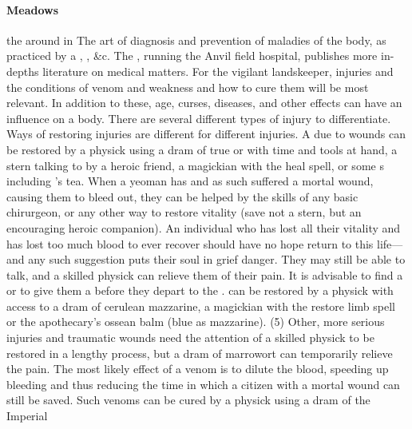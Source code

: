\paragraph{Meadows} the  around  in 
 The art of diagnosis and prevention of maladies of the body, as practiced by a , ,  \&c. The , running the Anvil field hospital, publishes more in-depths literature on medical matters. For the vigilant landskeeper, injuries and the conditions of venom and weakness and how to cure them will be most relevant. In addition to these, age, curses, diseases, and other effects can have an influence on a body. \localpar {} There are several different types of injury to differentiate. Ways of restoring injuries are different for different injuries. \localpar A  due to wounds can be restored by a physick using a dram of true  or with time and tools at hand, a stern talking to by a heroic friend, a magickian with the heal spell, or some s including 's tea. When a yeoman has  and as such suffered a mortal wound, causing them to bleed out, they can be helped by the skills of any basic chirurgeon, or any other way to restore vitality (save not a stern, but an encouraging heroic companion). An individual who has lost all their vitality and has lost too much blood to ever recover should have no hope return to this life—and any such suggestion puts their soul in grief danger. They may still be able to talk, and a skilled physick can relieve them of their pain. It is advisable to find a  or  to give them a  before they depart to the .  can be restored by a physick with access to a dram of cerulean mazzarine, a magickian with the restore limb spell or the apothecary's ossean balm (blue as mazzarine). (5) Other, more serious injuries and traumatic wounds need the attention of a skilled physick to be restored in a lengthy process, but a dram of marrowort can temporarily relieve the pain. \localpar {} The most likely effect of a venom is to dilute the blood, speeding up bleeding and thus reducing the time in which a citizen with a mortal wound can still be saved. Such venoms can be cured by a physick using a dram of the  Imperial %
